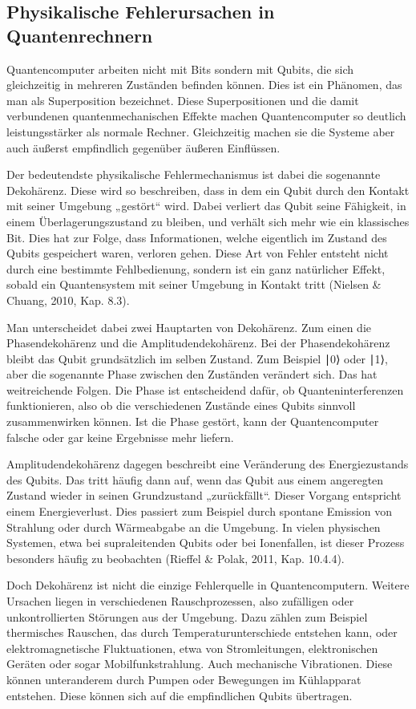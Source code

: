 \subsection{Physikalische Fehlerursachen in Quantenrechnern}
Quantencomputer arbeiten nicht mit Bits sondern mit Qubits, die sich gleichzeitig in mehreren Zuständen befinden können. Dies ist ein Phänomen, das man als Superposition bezeichnet. Diese Superpositionen und die damit verbundenen quantenmechanischen Effekte machen Quantencomputer so deutlich leistungsstärker als normale Rechner. Gleichzeitig machen sie die Systeme aber auch äußerst empfindlich gegenüber äußeren Einflüssen.

Der bedeutendste physikalische Fehlermechanismus ist dabei die sogenannte Dekohärenz. Diese wird so beschreiben, dass in dem ein Qubit durch den Kontakt mit seiner Umgebung „gestört“ wird. Dabei verliert das Qubit seine Fähigkeit, in einem Überlagerungszustand zu bleiben, und verhält sich mehr wie ein klassisches Bit. Dies hat zur Folge, dass Informationen, welche eigentlich im Zustand des Qubits gespeichert waren, verloren gehen. Diese Art von Fehler entsteht nicht durch eine bestimmte Fehlbedienung, sondern ist ein ganz natürlicher Effekt, sobald ein Quantensystem mit seiner Umgebung in Kontakt tritt (Nielsen & Chuang, 2010, Kap. 8.3).

Man unterscheidet dabei zwei Hauptarten von Dekohärenz. Zum einen die Phasendekohärenz und die Amplitudendekohärenz. Bei der Phasendekohärenz bleibt das Qubit grundsätzlich im selben Zustand. Zum Beispiel 
∣0⟩ oder ∣1⟩,
aber die sogenannte Phase zwischen den Zuständen verändert sich. Das hat  weitreichende Folgen. Die Phase ist entscheidend dafür, ob Quanteninterferenzen funktionieren, also ob die verschiedenen Zustände eines Qubits sinnvoll zusammenwirken können. Ist die Phase gestört, kann der Quantencomputer falsche oder gar keine Ergebnisse mehr liefern.

Amplitudendekohärenz dagegen beschreibt eine Veränderung des Energiezustands des Qubits. Das tritt häufig dann auf, wenn das Qubit aus einem angeregten Zustand wieder in seinen Grundzustand „zurückfällt“. Dieser Vorgang entspricht einem Energieverlust. Dies passiert zum Beispiel durch spontane Emission von Strahlung oder durch Wärmeabgabe an die Umgebung. In vielen physischen Systemen, etwa bei supraleitenden Qubits oder bei Ionenfallen, ist dieser Prozess besonders häufig zu beobachten (Rieffel \& Polak, 2011, Kap. 10.4.4).

Doch Dekohärenz ist nicht die einzige Fehlerquelle in Quantencomputern. Weitere Ursachen liegen in verschiedenen Rauschprozessen, also zufälligen oder unkontrollierten Störungen aus der Umgebung. Dazu zählen zum Beispiel thermisches Rauschen, das durch Temperaturunterschiede entstehen kann, oder elektromagnetische Fluktuationen, etwa von Stromleitungen, elektronischen Geräten oder sogar Mobilfunkstrahlung. Auch mechanische Vibrationen. Diese können unteranderem durch Pumpen oder Bewegungen im Kühlapparat entstehen. Diese können sich auf die empfindlichen Qubits übertragen.

